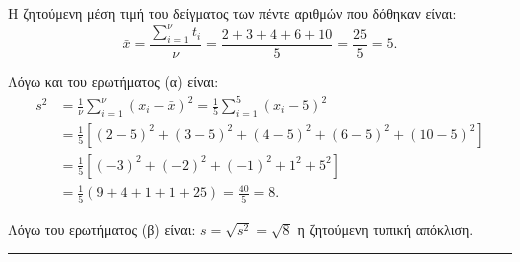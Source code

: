 
\begin{alist}
    \item Η ζητούμενη μέση τιμή του δείγματος των πέντε αριθμών που δόθηκαν είναι:
    \[ \bar{x} = \frac{\sum_{i=1}^{\nu} t_i}{\nu} = \frac{2+3+4+6+10}{5} = \frac{25}{5} = 5. \]
    \item Λόγω και του ερωτήματος (α) είναι:
    \begin{align*}
        s^2 &= \frac{1}{\nu}\sum_{i=1}^{\nu}(x_i - \bar{x})^2 = \frac{1}{5}\sum_{i=1}^{5}(x_i - 5)^2 \\
            &= \frac{1}{5}\left[ (2-5)^2 + (3-5)^2 + (4-5)^2 + (6-5)^2 + (10-5)^2 \right] \\
            &= \frac{1}{5}\left[ (-3)^2 + (-2)^2 + (-1)^2 + 1^2 + 5^2 \right] \\
            &= \frac{1}{5}(9+4+1+1+25) = \frac{40}{5} = 8.
    \end{align*}
    \item Λόγω του ερωτήματος (β) είναι: $s = \sqrt{s^2} = \sqrt{8}$ η ζητούμενη τυπική απόκλιση.
\end{alist}
\vspace{6mm}
\noindent\rule{\textwidth}{0.4pt}
\vspace{6mm}

